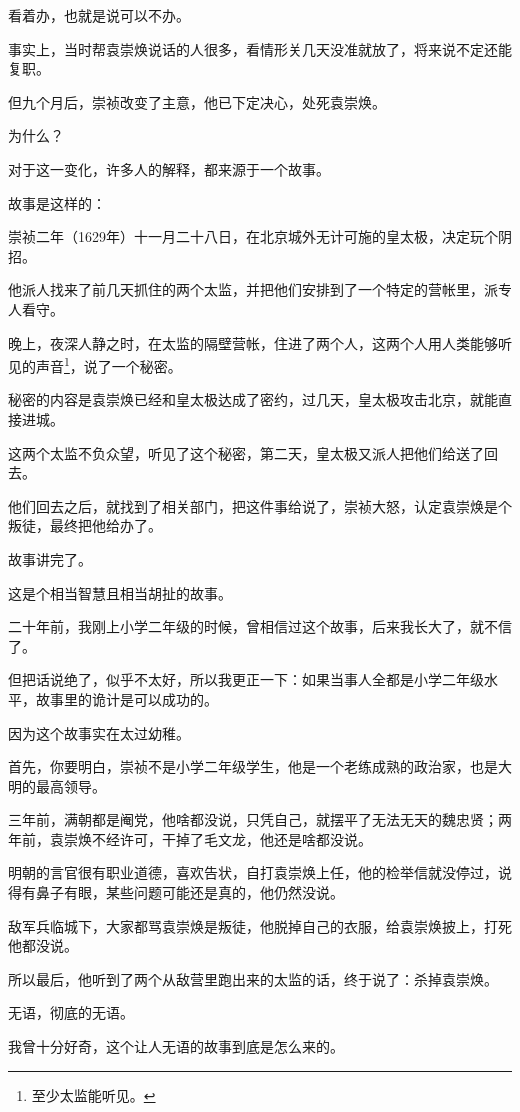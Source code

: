 \begin{multicols}{\theparacolNo}
		看着办，也就是说可以不办。

		事实上，当时帮袁崇焕说话的人很多，看情形关几天没准就放了，将来说不定还能复职。

		但九个月后，崇祯改变了主意，他已下定决心，处死袁崇焕。

		为什么？

		对于这一变化，许多人的解释，都来源于一个故事。

		故事是这样的：

		崇祯二年（1629年）十一月二十八日，在北京城外无计可施的皇太极，决定玩个阴招。

		他派人找来了前几天抓住的两个太监，并把他们安排到了一个特定的营帐里，派专人看守。

		晚上，夜深人静之时，在太监的隔壁营帐，住进了两个人，这两个人用人类能够听见的声音\footnote{至少太监能听见。}，说了一个秘密。

		秘密的内容是袁崇焕已经和皇太极达成了密约，过几天，皇太极攻击北京，就能直接进城。

		这两个太监不负众望，听见了这个秘密，第二天，皇太极又派人把他们给送了回去。

		他们回去之后，就找到了相关部门，把这件事给说了，崇祯大怒，认定袁崇焕是个叛徒，最终把他给办了。

		故事讲完了。

		这是个相当智慧且相当胡扯的故事。

		二十年前，我刚上小学二年级的时候，曾相信过这个故事，后来我长大了，就不信了。

		但把话说绝了，似乎不太好，所以我更正一下：如果当事人全都是小学二年级水平，故事里的诡计是可以成功的。

		因为这个故事实在太过幼稚。

		首先，你要明白，崇祯不是小学二年级学生，他是一个老练成熟的政治家，也是大明的最高领导。

		三年前，满朝都是阉党，他啥都没说，只凭自己，就摆平了无法无天的魏忠贤；两年前，袁崇焕不经许可，干掉了毛文龙，他还是啥都没说。

		明朝的言官很有职业道德，喜欢告状，自打袁崇焕上任，他的检举信就没停过，说得有鼻子有眼，某些问题可能还是真的，他仍然没说。

		敌军兵临城下，大家都骂袁崇焕是叛徒，他脱掉自己的衣服，给袁崇焕披上，打死他都没说。

		所以最后，他听到了两个从敌营里跑出来的太监的话，终于说了：杀掉袁崇焕。

		无语，彻底的无语。

		我曾十分好奇，这个让人无语的故事到底是怎么来的。


\end{multicols}
